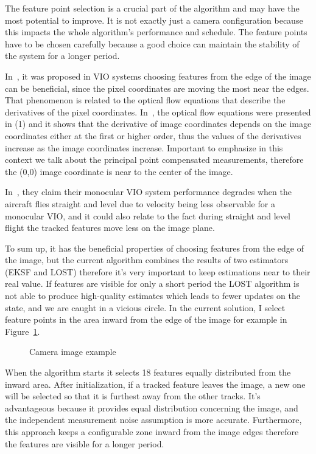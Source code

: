 The feature point selection is a crucial part of the algorithm and may have the most potential to improve. It is not exactly just a camera configuration because this impacts the whole algorithm's performance and schedule. The feature points have to be chosen carefully because a good choice can maintain the stability of the system for a longer period.

In~\cite{image-based-INS}, it was proposed in VIO systems choosing features from the edge of the image can be beneficial, since the pixel coordinates are moving the most near the edges. That phenomenon is related to the optical flow equations that describe the derivatives of the pixel coordinates. In~\cite{optic-flow}, the optical flow equations were presented in (1) and it shows that the derivative of image coordinates depends on the image coordinates either at the first or higher order, thus the values of the derivatives increase as the image coordinates increase. Important to emphasize in this context we talk about the principal point compensated measurements, therefore the (0,0) image coordinate is near to the center of the image.

In~\cite{rel-nav}, they claim their monocular VIO system performance degrades when the aircraft flies straight and level due to velocity being less observable for a monocular VIO, and it could also relate to the fact during straight and level flight the tracked features move less on the image plane.

To sum up, it has the beneficial properties of choosing features from the edge of the image, but the current algorithm combines the results of two estimators (EKSF and LOST) therefore it's very important to keep estimations near to their real value. If features are visible for only a short period the LOST algorithm is not able to produce high-quality estimates which leads to fewer updates on the state, and we are caught in a vicious circle. In the current solution, I select feature points in the area inward from the edge of the image for example in Figure~\ref{fig:camera-image}.

\begin{figure}[!ht]
    \centering
    
    \caption{Camera image example}\label{fig:camera-image}
\end{figure}

When the algorithm starts it selects 18 features equally distributed from the inward area. After initialization, if a tracked feature leaves the image, a new one will be selected so that it is furthest away from the other tracks. It's advantageous because it provides equal distribution concerning the image, and the independent measurement noise assumption is more accurate. Furthermore, this approach keeps a configurable zone inward from the image edges therefore the features are visible for a longer period.

